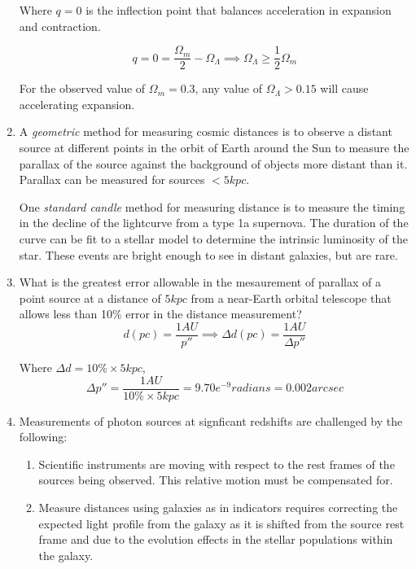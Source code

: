 \documentclass{paper}
\begin{document}
\begin{enumerate}
      Where \(q=0\) is the inflection point that balances acceleration
      in expansion and contraction.

      \[
        q = 0 = \frac{\Omega_m}{2}-\Omega_\Lambda \implies
        \Omega_\Lambda \geq \frac{1}{2}\Omega_m 
      \]

      For the observed value of \(\Omega_m = 0.3\), any value of 
      \(\Omega_\Lambda > 0.15\) will cause accelerating expansion.

    \item %
      A \textit{geometric} method for measuring cosmic distances is to 
      observe a distant source at different points in the orbit of Earth
      around the Sun to measure the parallax of the source against the
      background of objects more distant than it. Parallax can be measured
      for sources \(< 5 \si{kpc}\).

      One \textit{standard candle} method for measuring distance is to 
      measure the timing in the decline of the lightcurve from a type 1a
      supernova. The duration of the curve can be fit to a stellar model
      to determine the intrinsic luminosity of the star. These events are
      bright enough to see in distant galaxies, but are rare.
      
    \item %
      What is the greatest error allowable in the mesaurement of parallax
      of a point source at a distance of \(5 \si{kpc}\) from a near-Earth
      orbital telescope that allows less than 10\% error in the distance
      measurement?
      \[
        d(\si{pc}) = \frac{1 \si{AU}}{p\si{''}} \implies
        \Delta d(\si{pc}) = \frac{1 \si{AU}}{\Delta p\si{''}}
      \]

      Where \(\Delta d = 10\% \times 5 \si{kpc}\),
      \[ 
        \Delta p\si{''} = \frac{1 \si{AU}}{10\% \times 5 \si{kpc}} 
        = 9.70e^{-9} \si{radians} = 0.002 \si{arcsec}
      \]

    \item %
      Measurements of photon sources at signficant redshifts are challenged
      by the following:

      \begin{enumerate}

        \item
          Scientific instruments are moving with respect to the rest frames
          of the sources being observed. This relative motion must be
          compensated for.

        \item
          Measure distances using galaxies as in indicators requires 
          correcting the expected light profile from the galaxy as it is 
          shifted from the source rest frame and due to the evolution
          effects in the stellar populations within the galaxy.


\end{enumerate}
\end{enumerate}
\end{document}

